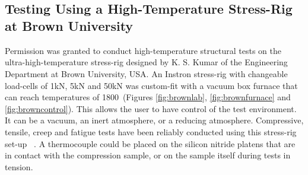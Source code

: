 ~~~~~~~~~~~~~


~~~~~~~~~~~~~

  


\subsection{Testing Using a High-Temperature Stress-Rig at Brown University}

Permission was granted to conduct high-temperature structural tests on the ultra-high-temperature stress-rig designed by K. S. Kumar of the Engineering Department at Brown University, USA.  An Instron stress-rig with changeable load-cells of 1kN, 5kN and 50kN was custom-fit with a vacuum box furnace that can reach temperatures of 1800\celsius\ (Figures \ref{fig:brownlab}, \ref{fig:brownfurnace} and \ref{fig:browncontrol}).  This allows the user to have control of the test environment.  It can be a vacuum, an inert atmosphere, or a reducing atmosphere. Compressive, tensile, creep and fatigue tests have been reliably conducted using this stress-rig set-up ~\cite{jain10}.  A thermocouple could be placed on the silicon nitride platens that are in contact with the compression sample, or on the sample itself during tests in tension.

